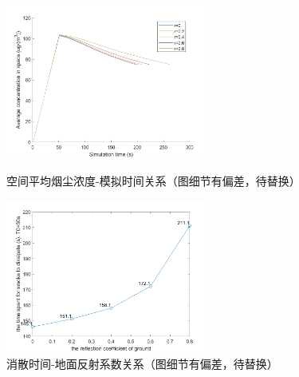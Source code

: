 \documentclass{article}
\begin{document}
	\begin{figure}[htbp]
		\centering
		\includegraphics[width=0.6\textwidth]{pics/relation-avg_concentration-t.png}
		\caption{空间平均烟尘浓度-模拟时间关系（图细节有偏差，待替换）}
		\label{fig19}
		\includegraphics[width=0.6\textwidth]{pics/relation-dissipate_time-r.png}
		\caption{消散时间-地面反射系数关系（图细节有偏差，待替换）}
		\label{fig20}
	\end{figure}
\end{document}
